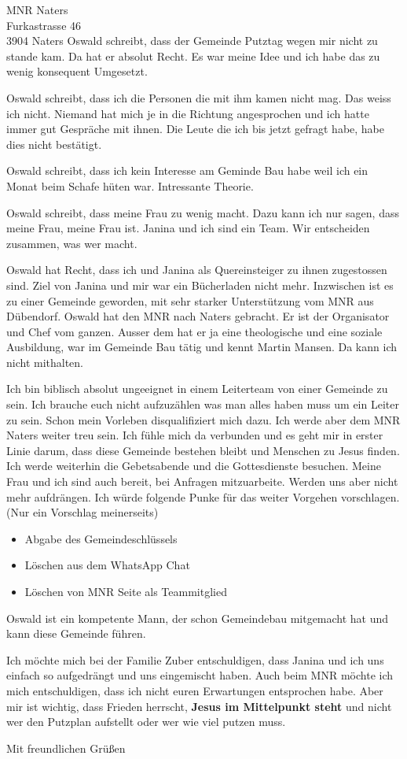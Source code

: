 \documentclass[private]{scrlttr2}
\begin{document}
\begin{letter}{
  MNR Naters \\
  Furkastrasse 46 \\
  3904 Naters
}
Oswald schreibt, dass der Gemeinde Putztag wegen mir nicht zu stande kam. Da hat er absolut Recht. Es war meine Idee und ich habe das zu wenig konsequent Umgesetzt.

Oswald schreibt, dass ich die Personen die mit ihm kamen nicht mag. Das weiss ich nicht. Niemand hat mich je in die Richtung angesprochen und ich hatte immer gut Gespräche mit ihnen. Die Leute die ich bis jetzt gefragt habe, habe dies nicht bestätigt.

Oswald schreibt, dass ich kein Interesse am Geminde Bau habe weil ich ein Monat beim Schafe hüten war. Intressante Theorie.

Oswald schreibt, dass meine Frau zu wenig macht. Dazu kann ich nur sagen, dass meine Frau, meine Frau ist. Janina und ich sind ein Team. Wir entscheiden zusammen, was wer macht.

Oswald hat Recht, dass ich und Janina als Quereinsteiger zu ihnen zugestossen sind. Ziel von Janina und mir war ein Bücherladen nicht mehr. Inzwischen ist es zu einer Gemeinde geworden, mit sehr starker Unterstützung vom MNR aus Dübendorf. Oswald hat den MNR nach Naters gebracht. Er ist der Organisator und Chef vom ganzen. Ausser dem hat er ja eine theologische und eine soziale Ausbildung, war im Gemeinde Bau tätig und kennt Martin Mansen. Da kann ich nicht mithalten.

Ich bin biblisch absolut ungeeignet in einem Leiterteam von einer Gemeinde zu sein. Ich brauche euch nicht aufzuzählen was man alles haben muss um ein Leiter zu sein. Schon mein Vorleben disqualifiziert mich dazu. Ich werde aber dem MNR Naters weiter treu sein. Ich fühle mich da verbunden und es geht mir in erster Linie darum, dass diese Gemeinde bestehen bleibt und Menschen zu Jesus finden. Ich werde weiterhin die Gebetsabende und die Gottesdienste besuchen. Meine Frau und ich sind auch bereit, bei Anfragen mitzuarbeite. Werden uns aber nicht mehr aufdrängen.
Ich würde folgende Punke für das weiter Vorgehen vorschlagen. (Nur ein Vorschlag meinerseits)
\begin{itemize}
    \item Abgabe des Gemeindeschlüssels
    \item Löschen aus dem WhatsApp Chat
    \item Löschen von MNR Seite als Teammitglied
\end{itemize}

Oswald ist ein kompetente Mann, der schon Gemeindebau mitgemacht hat und kann diese Gemeinde führen. 

Ich möchte mich bei der Familie Zuber entschuldigen, dass Janina und ich uns einfach so aufgedrängt und uns eingemischt haben. Auch beim MNR möchte ich mich entschuldigen, dass ich nicht euren Erwartungen entsprochen habe. Aber mir ist wichtig, dass Frieden herrscht, \textbf{Jesus im Mittelpunkt steht} und nicht wer den Putzplan aufstellt oder wer wie viel putzen muss.

\closing{Mit freundlichen Grüßen}

\end{letter}
\end{document}
